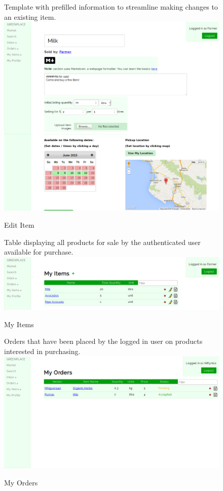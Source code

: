 \documentclass[letterpaper, 10 pt, conference]{ieeeconf}  %
\begin{document}
\begin{figure}[H]
  \caption{Edit Item}
  Template with prefilled information to streamline making changes to an existing item.\\
  \label{fig:itemedit}
  \centering
    \includegraphics[width=\textwidth]{images/itemedit.png}
\end{figure}

\begin{figure}[H]
  \caption{My Items}
  Table displaying all products for sale by the authenticated user available for purchase.\\
  \label{fig:myitems}
  \centering
    \includegraphics[width=\textwidth]{images/myitems.png}
\end{figure}

\begin{figure}[H]
  \caption{My Orders}
  Orders that have been placed by the logged in user on products interested in purchasing.\\
  \label{fig:myorders}
  \centering
    \includegraphics[width=\textwidth]{images/myorders.png}
\end{figure}
\end{document}
